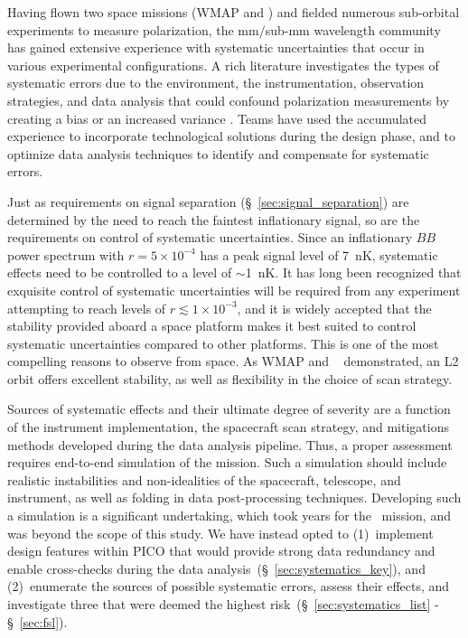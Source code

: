 \documentclass[PICOReport.tex]{subfiles}
\begin{document}
Having flown two space missions (WMAP and \planck ) and fielded numerous sub-orbital experiments to measure polarization, the mm/sub-mm wavelength community has gained extensive experience with systematic uncertainties that occur in various experimental configurations. 
A rich literature investigates the types of systematic errors due to the environment, the instrumentation, observation strategies, and data analysis that could confound polarization measurements by creating a bias or an increased variance \cite{hu03,shimon2008,yadav2010,Griffiths2014,LFI_systematics,Kaplan2002,Miller2009,Pagano2009}. Teams have used the accumulated experience to incorporate technological solutions during the design phase, and to optimize data analysis techniques to identify and compensate for systematic errors. 

Just as requirements on signal separation (\S~\ref{sec:signal_separation}) are determined by the need to reach the faintest inflationary signal, so are the requirements on control of systematic uncertainties. Since an inflationary $BB$ power spectrum with $r = 5 \times 10^{-4}$ has a peak signal level of 7~nK, systematic effects need to be controlled to a level of $\sim$1~nK. It has long been recognized that exquisite control of systematic uncertainties will be required from any experiment attempting to reach levels of $r \lesssim 1\times 10^{-3}$, and it is widely accepted that the stability provided aboard a space platform makes it best suited to control systematic uncertainties compared to other platforms. This is one of the most compelling reasons to observe from space.  As WMAP and \planck~ demonstrated, an L2 orbit offers excellent stability, as well as flexibility in the choice of scan strategy.  

Sources of systematic effects and their ultimate degree of severity are a function of the instrument implementation, the spacecraft scan strategy, and mitigations methods developed during the data analysis pipeline. Thus, a proper assessment requires end-to-end simulation of the mission. Such a simulation should include realistic instabilities and non-idealities of the spacecraft, telescope, and instrument, as well as folding in data post-processing techniques. Developing such a simulation is a significant undertaking, which took years  for the \planck\ mission, and was beyond the scope of this study. We have instead opted to (1)~implement design features within PICO that would provide strong data redundancy and enable cross-checks during the data analysis~(\S~\ref{sec:systematics_key}), and (2)~enumerate the sources of possible systematic errors, assess their effects, and investigate three that were deemed the highest risk~(\S~\ref{sec:systematics_list} - \S~\ref{sec:fsl}). 
\end{document}
